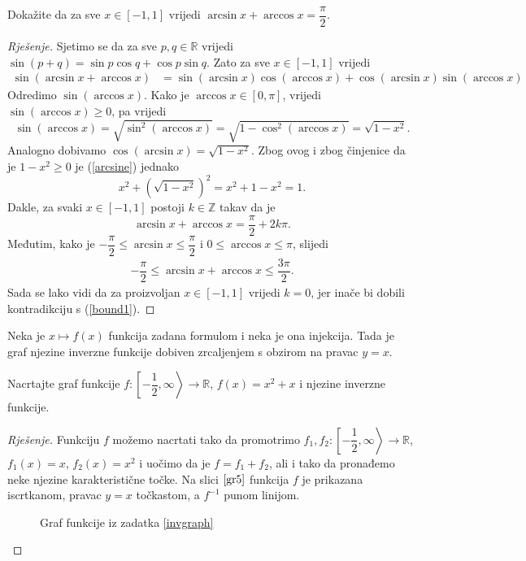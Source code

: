 \begin{exercise}
Dokažite da za sve $x\in [-1, 1]$ vrijedi $\arcsin{x}+\arccos{x}=\dfrac{\pi}{2}$.
\end{exercise}
\begin{proof}[Rješenje]
Sjetimo se da za sve $p, q\in \mathbb{R}$ vrijedi $\sin(p+q)=\sin{p}\cos{q}+\cos{p}\sin{q}$. Zato za sve $x\in [-1, 1]$ vrijedi
\begin{align}
\label{arcsine}
\sin(\arcsin{x}+\arccos{x})&=\sin(\arcsin{x})\cos(\arccos{x})+\cos(\arcsin{x})\sin(\arccos{x})
\end{align}
Odredimo $\sin(\arccos{x})$. Kako je $\arccos{x}\in [0, \pi]$, vrijedi $\sin(\arccos{x})\geq 0$, pa vrijedi
$$\sin(\arccos{x})=\sqrt{\sin^2(\arccos{x})}=\sqrt{1-\cos^2(\arccos{x})}=\sqrt{1-x^2}.$$
Analogno dobivamo $\cos(\arcsin{x})=\sqrt{1-x^2}$. Zbog ovog i zbog činjenice da je $1-x^2\geq 0$ je (\ref{arcsine}) jednako
$$x^2+\left(\sqrt{1-x^2}\right)^2=x^2+1-x^2=1.$$
Dakle, za svaki $x\in [-1, 1]$ postoji $k\in \mathbb{Z}$ takav da je
$$\arcsin{x}+\arccos{x}=\dfrac{\pi}{2}+2k\pi.$$
Međutim, kako je $-\dfrac{\pi}{2}\leq \arcsin{x}\leq \dfrac{\pi}{2}$ i $0\leq \arccos{x}\leq \pi$, slijedi 
\begin{align}
\label{bound1}
-\dfrac{\pi}{2}\leq \arcsin{x}+\arccos{x}\leq \dfrac{3\pi}{2}.
\end{align}
Sada se lako vidi da za proizvoljan $x\in [-1, 1]$ vrijedi $k=0$, jer inače bi dobili kontradikciju s (\ref{bound1}).
\end{proof}
\begin{remark}
Neka je $x\mapsto f(x)$ funkcija zadana formulom i neka je ona injekcija. Tada je graf njezine inverzne funkcije dobiven zrcaljenjem s obzirom na pravac $y=x$.
\end{remark}
\begin{exercise}
\label{invgraph}
Nacrtajte graf funkcije $f : \left[-\dfrac{1}{2}, \infty\right\rangle\to \mathbb{R}$, $f(x)=x^2+x$ i njezine inverzne funkcije.
\end{exercise}
\begin{proof}[Rješenje]
Funkciju $f$ možemo nacrtati tako da promotrimo $f_1, f_2 : \left[-\dfrac{1}{2}, \infty\right\rangle\to \mathbb{R}$, $f_1(x)=x$, $f_2(x)=x^2$ i uočimo da je $f=f_1+f_2$, ali i tako da pronađemo neke njezine karakteristične točke. Na slici $\ref{gr5}$ funkcija $f$ je prikazana iscrtkanom, pravac $y=x$ točkastom, a $f^{-1}$ punom linijom.
\begin{figure}[ht]
\begin{center}
\end{center}
\caption{\label{gr5} Graf funkcije iz zadatka \ref{invgraph}}
\end{figure}
\end{proof}
